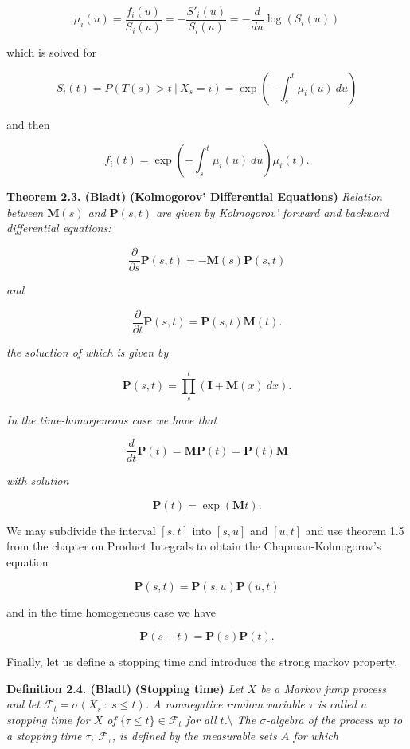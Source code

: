 \documentclass[a4paper,12pt,openany]{book}
\begin{document}
\[
\mu_i(u)=\frac{f_i(u)}{S_i(u)}=-\frac{S'_i(u)}{S_i(u)}=-\frac{d}{du}\log(S_i(u))
\]

which is solved for

\[
S_i(t)=P(T(s)>t\ \vert\ X_s=i)=\exp\left(-\int_s^t \mu_i(u)\ du\right)
\]

and then

\[
f_i(t)=\exp\left(-\int_s^t \mu_i(u)\ du\right)\mu_i(t).
\]

\textbf{Theorem 2.3. (Bladt)} \textbf{(Kolmogorov' Differential Equations)} \emph{Relation between \(\mathbf{M}(s)\) and \(\mathbf{P}(s,t)\) are given by Kolmogorov' forward and backward differential equations:}

\[
\frac{\partial}{\partial s}\mathbf{P}(s,t)=-\mathbf{M}(s)\mathbf{P}(s,t)
\]

\emph{and}

\[
\frac{\partial}{\partial t}\mathbf{P}(s,t)=\mathbf{P}(s,t)\mathbf{M}(t).
\]

\emph{the soluction of which is given by}

\[
\mathbf{P}(s,t)=\prod_s^t(\mathbf{I}+\mathbf{M}(x)\ dx).
\]

\emph{In the time-homogeneous case we have that}

\[
\frac{d}{d t}\mathbf{P}(t)=\mathbf{M}\mathbf{P}(t)=\mathbf{P}(t)\mathbf{M}
\]

\emph{with solution}

\[
\mathbf{P}(t)=\exp(\mathbf{M}t).
\]

We may subdivide the interval \([s,t]\) into \([s,u]\) and \([u,t]\) and use theorem 1.5 from the chapter on Product Integrals to obtain the Chapman-Kolmogorov's equation

\[
\mathbf{P}(s,t)=\mathbf{P}(s,u)\mathbf{P}(u,t)
\]

and in the time homogeneous case we have

\[
\mathbf{P}(s+t)=\mathbf{P}(s)\mathbf{P}(t).
\]

Finally, let us define a stopping time and introduce the strong markov property.

\textbf{Definition 2.4. (Bladt)} \textbf{(Stopping time)} \emph{Let \(X\) be a Markov jump process and let \(\mathcal{F}_t=\sigma(X_s\ :\ s\le t)\). A nonnegative random variable \(\tau\) is called a stopping time for \(X\) of \(\{\tau \le t\}\in\mathcal{F}_t\) for all \(t\).}\textbackslash{}
\emph{The \(\sigma\)-algebra of the process up to a stopping time \(\tau\), \(\mathcal{F}_\tau\), is defined by the measurable sets \(A\) for which}
\end{document}
